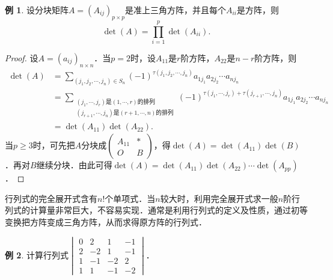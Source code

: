 \documentclass[a4paper,fontset=windows]{ctexbook}
\theoremstyle{definition}
\newtheorem{example}{例}[chapter]
\renewcommand{\ge}{\geqslant}
\begin{document}
\begin{example}
设分块矩阵$A=(A_{ij})_{p\times p}$是准上三角方阵，并且每个$A_{ii}$是方阵，则
$$\det(A)=\prod\limits_{i=1}^p\det(A_{ii}).$$
\end{example}

\begin{proof}
设$A=(a_{ij})_{n\times n}$．当$p=2$时，设$A_{11}$是$r$阶方阵，$A_{22}$是$n-r$阶方阵，则
\begin{align*}
\det(A)&=\sum_{(j_1,j_2,\cdots,j_n)\in S_n}(-1)^{\tau(j_1,j_2,\cdots,j_n)}a_{1j_1}a_{2j_2}\cdots a_{nj_n} \\
&=\sum_{\substack{(j_1,\cdots,j_r)\text{是}(1,\cdots,r)\text{的排列} \\ (j_{r+1},\cdots,j_n)\text{是}(r+1,\cdots,n)\text{的排列}}}(-1)^{\tau(j_1,\cdots,j_r)+\tau(j_{r+1},\cdots,j_n)}a_{1j_1}a_{2j_2}\cdots a_{nj_n} \\
&=\det(A_{11})\det(A_{22}).
\end{align*}
当$p\ge 3$时，可先把$A$分块成$\begin{pmatrix}A_{11}&* \\ O&B\end{pmatrix}$，得$\det(A)=\det(A_{11})\det(B)$．再对$B$继续分块．由此可得$\det(A)=\det(A_{11})\det(A_{22})\cdots\det(A_{pp})$．
\end{proof}

行列式的完全展开式含有$n!$个单项式．当$n$较大时，利用完全展开式求一般$n$阶行列式的计算量非常巨大，不容易实现．通常是利用行列式的定义及性质，通过初等变换把方阵变成三角方阵，从而求得原方阵的行列式．

\begin{example}
计算行列式$\begin{vmatrix}0&2&1&-1 \\ 2&-2&1&-1 \\ 1&-1&-2&2 \\ 1&1&-1&-2\end{vmatrix}$．
\end{example}
\end{document}
